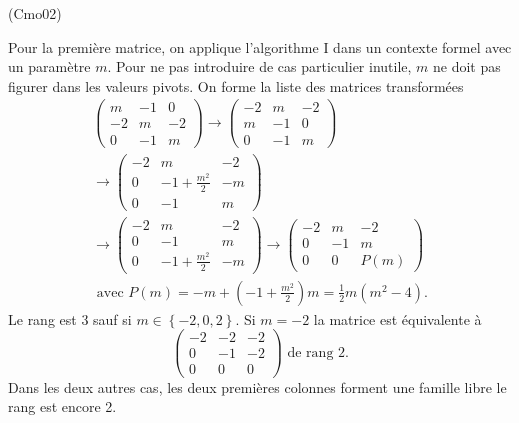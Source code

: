 \begin{tiny}(Cmo02)\end{tiny} Pour la première matrice, on applique l'algorithme I dans un contexte formel avec un paramètre $m$.
Pour ne pas introduire de cas particulier inutile, $m$ ne doit pas figurer dans les valeurs pivots. On forme la liste des matrices transformées
\begin{multline*}
  \begin{pmatrix}
    m & -1 & 0 \\
    -2 & m & -2 \\
    0 & -1 & m
  \end{pmatrix}
\rightarrow
  \begin{pmatrix}
    -2 & m & -2 \\
    m & -1 & 0 \\
    0 & -1 & m
  \end{pmatrix} \\
\rightarrow
  \begin{pmatrix}
    -2 & m & -2 \\
    0 & -1 + \frac{m^2}{2} & -m \\
    0 & -1 & m
  \end{pmatrix} \\
\rightarrow
  \begin{pmatrix}
    -2 & m & -2 \\
    0 & -1 & m\\
    0 & -1 + \frac{m^2}{2} & -m 
  \end{pmatrix}
\rightarrow
  \begin{pmatrix}
    -2 & m & -2 \\
    0 & -1 & m\\
    0 & 0 & P(m) 
  \end{pmatrix} \\
\text{ avec }
P(m) = -m + \left( -1 + \frac{m^2}{2}\right)m
= \frac{1}{2}m(m^2 - 4).
\end{multline*}
Le rang est 3 sauf si $m\in \left\lbrace -2, 0, 2\right\rbrace$.\newline
Si $m = -2$ la matrice est équivalente à
\[
  \begin{pmatrix}
    -2 & -2 & -2 \\
    0 & -1 & -2\\
    0 & 0 & 0 
  \end{pmatrix}
  \text{ de rang 2.}
\]
Dans les deux autres cas, les deux premières colonnes forment une famille libre le rang est encore 2.

